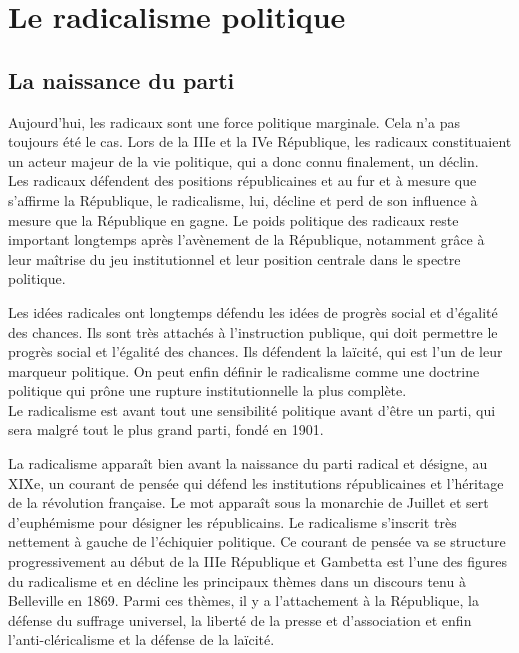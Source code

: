 \documentclass[10pt, a4paper, openany]{book}
\begin{document}
\chapter{Le radicalisme politique}

\section{La naissance du parti}

Aujourd'hui, les radicaux sont une force politique marginale. Cela n'a pas toujours été le cas. Lors de la IIIe et la IVe République, les radicaux constituaient un acteur majeur de la vie politique, qui a donc connu finalement, un déclin. \\
Les radicaux défendent des positions républicaines et au fur et à mesure que s'affirme la République, le radicalisme, lui, décline et perd de son influence à mesure que la République en gagne. Le poids politique des radicaux reste important longtemps après l'avènement de la République, notamment grâce à leur maîtrise du jeu institutionnel et leur position centrale dans le spectre politique.


Les idées radicales ont longtemps défendu les idées de progrès social et d'égalité des chances. Ils sont très attachés à l'instruction publique, qui doit permettre le progrès social et l'égalité des chances. Ils défendent la laïcité, qui est l'un de leur marqueur politique. On peut enfin définir le radicalisme comme une doctrine politique qui prône une rupture institutionnelle la plus complète. \\
Le radicalisme est avant tout une sensibilité politique avant d'être un parti, qui sera malgré tout le plus grand parti, fondé en 1901.


La radicalisme apparaît bien avant la naissance du parti radical et désigne, au XIXe, un courant de pensée qui défend les institutions républicaines et l'héritage de la révolution française. Le mot apparaît sous la monarchie de Juillet et sert d'euphémisme pour désigner les républicains. Le radicalisme s'inscrit très nettement à gauche de l'échiquier politique. Ce courant de pensée va se structure progressivement au début de la IIIe République et Gambetta est l'une des figures du radicalisme et en décline les principaux thèmes dans un discours tenu à Belleville en 1869. Parmi ces thèmes, il y a l'attachement à la République, la défense du suffrage universel, la liberté de la presse et d'association et enfin l'anti-cléricalisme et la défense de la laïcité. 
\end{document}
